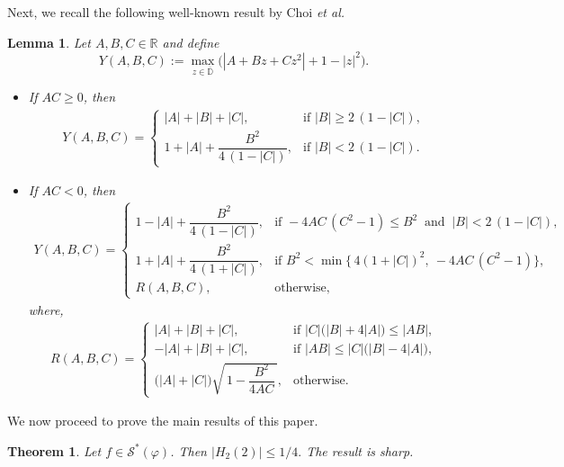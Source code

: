 \documentclass[a4paper,12pt,reqno]{amsart} %
\numberwithin{equation}{section}
\newtheorem{thm}{Theorem}[section]
\newtheorem{lem}{Lemma}[section]
\theoremstyle{definition}
\newcounter{own}
\begin{document}
Next, we recall the following well-known result by Choi \textit{et al.} \cite{ChoiKimSugawa2007}
\begin{lem}\label{lemma3} {\cite{ChoiKimSugawa2007}}
Let $A,B,C\in\mathbb R$ and define
\begin{equation*}
Y(A,B,C):=\max_{z\in\overline{\mathbb D}}\Big(|A+Bz+Cz^{2}|+1-|z|^{2}\Big).
\end{equation*}
\begin{itemize}
\item[(i)] If $AC\ge 0$, then
\begin{align*}
	Y(A,B,C)=
	\begin{cases}
		|A|+|B|+|C|, & \text{if } |B|\ge 2\,(1-|C|),\\[6pt]
		1+|A|+\dfrac{B^{2}}{4\,(1-|C|)}, & \text{if } |B|<2\,(1-|C|).
	\end{cases}
\end{align*}
\item[(ii)] If $AC<0$, then
\begin{align*}
	Y(A,B,C)=
	\begin{cases}
		1-|A|+\dfrac{B^{2}}{4\,(1-|C|)}, & \text{if } -4AC\,(C^{2}-1)\le B^{2}\ \text{ and }\ |B|<2\,(1-|C|),\\[8pt]
		1+|A|+\dfrac{B^{2}}{4\,(1+|C|)}, & \text{if } B^{2}<\min\!\big\{\,4(1+|C|)^{2},\ -4AC\,(C^{2}-1)\big\},\\[8pt]
		R(A,B,C), & \text{otherwise,}
	\end{cases}
\end{align*}
where,
\begin{align*}
	R(A,B,C)=
	\begin{cases}
		|A|+|B|+|C|, & \text{if } |C|\big(|B|+4|A|\big)\le |AB|,\\[6pt]
		-|A|+|B|+|C|, & \text{if } |AB|\le |C|\big(|B|-4|A|\big),\\[10pt]
		\big(|A|+|C|\big)\sqrt{\,1-\dfrac{B^{2}}{4AC}\,}, & \text{otherwise.}
	\end{cases}
\end{align*}
\end{itemize}
\end{lem}
We now proceed to prove the main results of this paper.
\begin{thm}
Let $f \in \mathcal{S}^*(\varphi)$. Then
$
|H_2(2)| \leq {1}/{4}.
$
The result is sharp.
\end{thm}
\end{document}
